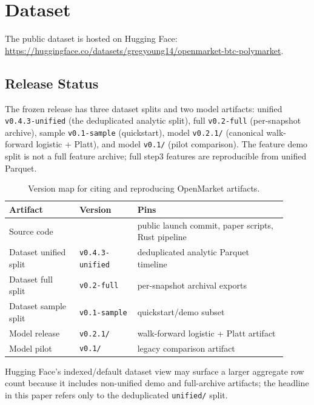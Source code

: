 \section{Dataset}
\label{sec:dataset}

The public dataset is hosted on Hugging Face:
\url{https://huggingface.co/datasets/gregyoung14/openmarket-btc-polymarket}.

\subsection{Release Status}
\label{sec:dataset-status}

The frozen release has three dataset splits and two model artifacts: unified
\texttt{v0.4.3-unified} (the deduplicated analytic split), full
\texttt{v0.2-full} (per-snapshot archive), sample \texttt{v0.1-sample}
(quickstart), model \texttt{v0.2.1/} (canonical walk-forward logistic + Platt),
and model \texttt{v0.1/} (pilot comparison). The feature demo split is not a
full feature archive; full step3 features are reproducible from unified Parquet.

\begin{table}[t]
  \centering
  \caption{Version map for citing and reproducing OpenMarket artifacts.}
  \label{tab:artifact-versions}
  \footnotesize
  \setlength{\tabcolsep}{3pt}
  \begin{tabular}{@{}p{0.23\linewidth}p{0.19\linewidth}p{0.49\linewidth}@{}}
    \toprule
    Artifact & Version & Pins \\
    \midrule
    Source code & \OpenMarketReleaseTag{} & public launch commit, paper scripts, Rust pipeline \\
    Dataset unified split & \texttt{v0.4.3-unified} & deduplicated analytic Parquet timeline \\
    Dataset full split & \texttt{v0.2-full} & per-snapshot archival exports \\
    Dataset sample split & \texttt{v0.1-sample} & quickstart/demo subset \\
    Model release & \texttt{v0.2.1/} & walk-forward logistic + Platt artifact \\
    Model pilot & \texttt{v0.1/} & legacy comparison artifact \\
    \bottomrule
  \end{tabular}
\end{table}

Hugging Face's indexed/default dataset view may surface a larger aggregate row
count because it includes non-unified demo and full-archive artifacts; the
\OpenMarketTotalRows{} headline in this paper refers only to the deduplicated
\texttt{unified/} split.

